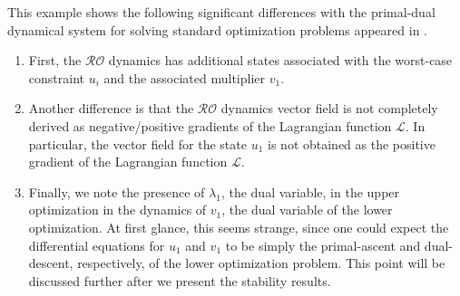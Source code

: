 \documentclass[journal,twoside,web]{ieeecolor}
\begin{document}
This example shows the following significant differences with the primal-dual dynamical system for solving standard optimization problems appeared in \cite{feijer2010,cherukuri2016}.
\begin{enumerate}
\item First, the $\mathcal{RO}$ dynamics has additional states associated with the worst-case constraint $u_i$ and the associated multiplier $v_1$.
\item Another difference is that the $\mathcal{RO}$ dynamics vector field is not completely derived as negative/positive gradients of the Lagrangian function $\mathcal{L}$. In particular, the vector field for the state $u_1$ is not obtained as the positive gradient of the Lagrangian function $\mathcal{L}$.
\item Finally, we note the presence of $\lambda_1$, the dual variable, in the upper optimization in the dynamics of $v_1$, the dual variable of the lower optimization. At first glance, this seems strange, since one could expect the differential equations for $u_1$ and $v_1$ to be simply the primal-ascent and dual-descent, respectively, of the lower optimization problem. This point will be discussed further after we present the stability results.
\end{enumerate}
\end{document}
